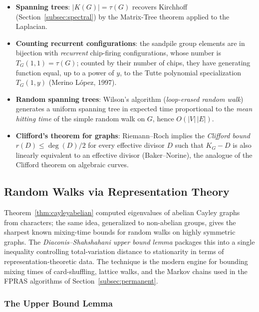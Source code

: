 \begin{itemize}
  \item \textbf{Spanning trees}: $|K(G)| = \tau(G)$ recovers
        Kirchhoff (Section~\ref{subsec:spectral}) by the Matrix-Tree theorem applied to
        the Laplacian.
  \item \textbf{Counting recurrent configurations}: the sandpile
        group elements are in bijection with \emph{recurrent}
        chip-firing configurations, whose number is
        $T_G(1, 1) = \tau(G)$; counted by their number of chips, they
        have generating function equal, up to a power of $y$, to the
        Tutte polynomial specialization $T_G(1, y)$ (Merino L\'opez,
        1997).
  \item \textbf{Random spanning trees}: Wilson's algorithm
        (\emph{loop-erased random walk}) generates a uniform spanning
        tree in expected time proportional to the \emph{mean hitting
        time} of the simple random walk on $G$, hence $O(|V|\,|E|)$.
  \item \textbf{Clifford's theorem for graphs}: Riemann--Roch implies
        the \emph{Clifford bound} $r(D) \le \deg(D)/2$ for every
        effective divisor $D$ such that $K_G - D$ is also linearly
        equivalent to an effective divisor (Baker--Norine), the
        analogue of the Clifford theorem on algebraic curves.
\end{itemize}

\subsection{Random Walks via Representation Theory}\label{subsec:random-walks-rep}

Theorem~\ref{thm:cayleyabelian} computed eigenvalues of abelian
Cayley graphs from characters; the same idea, generalized to
non-abelian groups, gives the sharpest known mixing-time bounds for
random walks on highly symmetric graphs. The
\emph{Diaconis--Shahshahani upper bound lemma} packages this into a
single inequality controlling total-variation distance to stationarity
in terms of representation-theoretic data. The technique is the
modern engine for bounding mixing times of card-shuffling, lattice
walks, and the Markov chains used in the FPRAS algorithms of
Section~\ref{subsec:permanent}.

\subsubsection{The Upper Bound Lemma}

